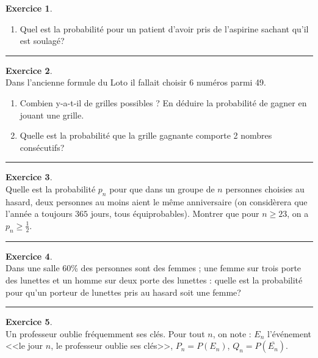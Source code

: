 \documentclass[a4paper,10pt]{article}
\theoremstyle{definition}
\theoremstyle{definition}
\newtheorem{exo}{Exercice}
\begin{document}
\begin{minipage}{1\linewidth}
\begin{minipage}[t]{0.48\linewidth}
\begin{exo}
\begin{enumerate}
			\item Quel est la probabilité pour un patient d'avoir pris de l'aspirine
			sachant qu'il est soulagé?
		\end{enumerate}
			
			\centering
			\rule{1\linewidth}{0.6pt}
		\end{exo}
	
\begin{exo} \quad\\
	Dans l'ancienne formule du Loto il fallait choisir 6 numéros parmi 49.
\begin{enumerate}
	\item Combien y-a-t-il de grilles possibles ? En déduire la probabilité de
	gagner en jouant une grille.
	
	\item Quelle est la probabilité que la grille gagnante comporte 2
	nombres consécutifs?
\end{enumerate}	
		
		\centering
		\rule{1\linewidth}{0.6pt}
	\end{exo}
	

	\end{minipage}	
	\hfill\vrule\hfill
	\begin{minipage}[t]{0.48\linewidth}
		\raggedright
		
		
		\begin{exo}\quad\\
	Quelle est la probabilité $p_n$ pour que dans un groupe de $n$ personnes choisies au hasard, deux personnes au moins aient le même anniversaire (on considèrera que l'année a toujours $365$ jours, tous équiprobables). Montrer que pour $n\geq23$, on a $p_n\geq\frac{1}{2}$.
	
	\centering
	\rule{1\linewidth}{0.6pt}
\end{exo}
		
		
		
		\begin{exo}\quad\\
		Dans une salle $60$\% des personnes sont des femmes ; une femme sur trois
		porte des lunettes et un homme sur deux porte des lunettes : quelle est la
		probabilité pour qu'un porteur de lunettes pris au hasard soit une femme?
			
			\centering
			\rule{1\linewidth}{0.6pt}
		\end{exo}
		
		\begin{exo}\quad\\
		Un professeur oublie fréquemment ses clés. Pour tout $n$, on note :
		$E_n$ l'événement <<le jour $n$, le professeur oublie ses clés>>, 
		$P_{n}=P(E_n)$, $Q_n=P(\overline{E_n})$.
		

\end{exo}
\end{minipage}
\end{minipage}
\end{document}

